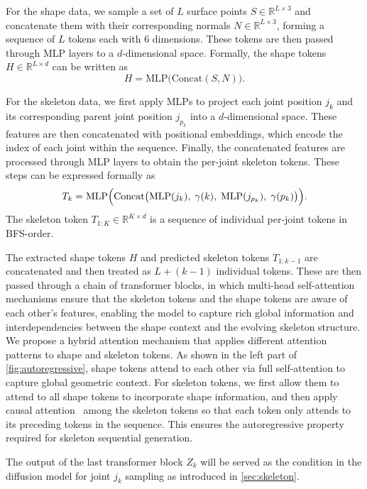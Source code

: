 For the shape data, we sample a set of $L$ surface points $S \in \mathbb{R}^{L \times 3}$ and concatenate them with their corresponding normals $N \in \mathbb{R}^{L \times 3}$, forming a sequence of $L$ tokens each with $6$ dimensions. 
These tokens are then passed through MLP layers to a $d$-dimensional space. 
Formally, the shape tokens $H \in \mathbb{R}^{L \times d}$ can be written as
\begin{equation}
    H = \text{MLP} \bigl ( \text{Concat} (S, N) \bigr ).
\end{equation}
% 

For the skeleton data, we first apply MLPs to project each joint position $j_k$ and its corresponding parent joint position $j_{p_k}$ into a $d$-dimensional space. These features are then concatenated with positional embeddings, which encode the index of each joint within the sequence. 
Finally, the concatenated features are processed through MLP layers to obtain the per-joint skeleton tokens. These steps can be expressed formally as
\begin{equation}
    T_{k} = \text{MLP}\Bigl( \text{Concat}\bigl( \text{MLP}(j_k),\; \gamma(k),\; \text{MLP}(j_{p_k}),\; \gamma(p_k) \bigr) \Bigr).
\end{equation}
The skeleton token $T_{1:K}\in \mathbb{R}^{K\times d}$ is a sequence of individual per-joint tokens in BFS-order.

 The extracted shape tokens $H$ and predicted skeleton tokens $T_{1:k-1}$ are concatenated and then treated as $L + \left(k-1\right)$ individual tokens. These are then passed through a chain of transformer blocks, in which multi-head self-attention mechanisms ensure that the skeleton tokens and the shape tokens are aware of each other's features, enabling the model to capture rich global information and interdependencies between the shape context and the evolving skeleton structure.
% 
We propose a hybrid attention mechanism that applies different attention patterns to shape and skeleton tokens. As shown in the left part of \cref{fig:autoregressive}, shape tokens attend to each other via full self-attention to capture global geometric context. 
For skeleton tokens, we first allow them to attend to all shape tokens to incorporate shape information, and then apply causal attention~\cite{waswani2017attention,radford2019language} among the skeleton tokens so that each token only attends to its preceding tokens in the sequence. This ensures the autoregressive property required for skeleton sequential generation. 

The output of the last transformer block $Z_k$ will be served as the condition in the diffusion model for joint $j_k$ sampling as introduced in \cref{sec:skeleton}.
